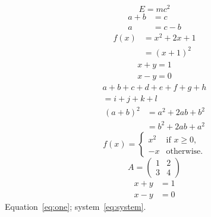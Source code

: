 \documentclass[11pt]{article}
\begin{document}
\begin{equation}\label{eq:one}E=mc^2\end{equation}
\begin{align}a+b&=c\\a&=c-b\end{align}
\begin{equation}\begin{aligned}f(x)&=x^2+2x+1\\&=(x+1)^2\end{aligned}\end{equation}
\begin{gather}x+y=1\\x-y=0\end{gather}
\begin{multline}a+b+c+d+e+f+g+h\\=i+j+k+l\end{multline}
\begin{equation}\begin{split}(a+b)^2&=a^2+2ab+b^2\\&=b^2+2ab+a^2\end{split}\end{equation}
\[ f(x)=\begin{cases}x^2&\text{if }x\ge0,\\-x&\text{otherwise.}\end{cases}\]
\[A=\begin{pmatrix}1&2\\3&4\end{pmatrix}\]
\begin{subequations}\label{eq:system}\begin{align}x+y&=1\label{eq:sysa}\\x-y&=0\end{align}\end{subequations}
Equation~\eqref{eq:one}; system~\eqref{eq:system}.
\end{document}

